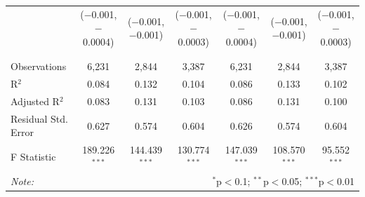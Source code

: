 \documentclass[alpha-refs]{wiley-article-01g}
\begin{document}
\begin{landscape}
\begin{table}[!htbp]
\begin{tabular}{@{\extracolsep{5pt}}lcccccc}
			& ($-$0.001, $-$0.0004) & ($-$0.001, $-$0.001) & ($-$0.001, $-$0.0003) & ($-$0.001, $-$0.0004) & ($-$0.001, $-$0.001) & ($-$0.001, $-$0.0003) \\ 
			& & & & & & \\ 
			\hline \\[-.8ex] 
			Observations & 6,231 & 2,844 & 3,387 & 6,231 & 2,844 & 3,387 \\ 
			R$^{2}$ & 0.084 & 0.132 & 0.104 & 0.086 & 0.133 & 0.102 \\ 
			Adjusted R$^{2}$ & 0.083 & 0.131 & 0.103 & 0.086 & 0.131 & 0.100 \\ 
			Residual Std. Error & 0.627 & 0.574 & 0.604 & 0.626 & 0.574 & 0.604 \\ 
			F Statistic & 189.226$^{***}$ & 144.439$^{***}$ & 130.774$^{***}$ & 147.039$^{***}$ & 108.570$^{***}$ & 95.552$^{***}$ \\ 
			\hline 
			\textit{Note:}  & \multicolumn{6}{r}{$^{*}$p$<$0.1; $^{**}$p$<$0.05; $^{***}$p$<$0.01} \\ 
		\end{tabular} 
	\end{table} 
	
\end{landscape}

\newpage
\end{document}

